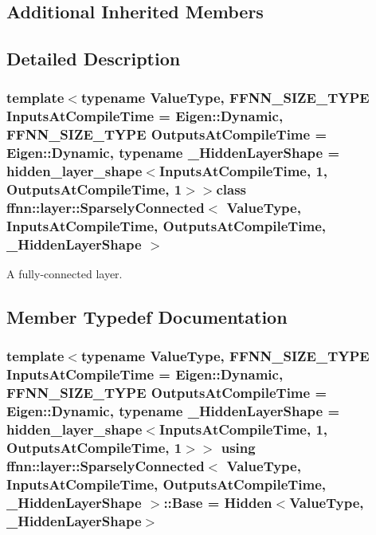 \subsection*{Additional Inherited Members}


\subsection{Detailed Description}
\subsubsection*{template$<$typename Value\-Type, F\-F\-N\-N\-\_\-\-S\-I\-Z\-E\-\_\-\-T\-Y\-P\-E Inputs\-At\-Compile\-Time = Eigen\-::\-Dynamic, F\-F\-N\-N\-\_\-\-S\-I\-Z\-E\-\_\-\-T\-Y\-P\-E Outputs\-At\-Compile\-Time = Eigen\-::\-Dynamic, typename \-\_\-\-Hidden\-Layer\-Shape = hidden\-\_\-layer\-\_\-shape$<$\-Inputs\-At\-Compile\-Time, 1, Outputs\-At\-Compile\-Time, 1$>$$>$class ffnn\-::layer\-::\-Sparsely\-Connected$<$ Value\-Type, Inputs\-At\-Compile\-Time, Outputs\-At\-Compile\-Time, \-\_\-\-Hidden\-Layer\-Shape $>$}

A fully-\/connected layer. 

\subsection{Member Typedef Documentation}
\hypertarget{classffnn_1_1layer_1_1_sparsely_connected_a477e3c462a713ae90ac5d68c94445a08}{
\subsubsection[{Base}]{\setlength{\rightskip}{0pt plus 5cm}template$<$typename Value\-Type, F\-F\-N\-N\-\_\-\-S\-I\-Z\-E\-\_\-\-T\-Y\-P\-E Inputs\-At\-Compile\-Time = Eigen\-::\-Dynamic, F\-F\-N\-N\-\_\-\-S\-I\-Z\-E\-\_\-\-T\-Y\-P\-E Outputs\-At\-Compile\-Time = Eigen\-::\-Dynamic, typename \-\_\-\-Hidden\-Layer\-Shape = hidden\-\_\-layer\-\_\-shape$<$\-Inputs\-At\-Compile\-Time, 1, Outputs\-At\-Compile\-Time, 1$>$$>$ using {\bf ffnn\-::layer\-::\-Sparsely\-Connected}$<$ Value\-Type, Inputs\-At\-Compile\-Time, Outputs\-At\-Compile\-Time, \-\_\-\-Hidden\-Layer\-Shape $>$\-::{\bf Base} =  {\bf Hidden}$<$Value\-Type, \-\_\-\-Hidden\-Layer\-Shape$>$}}\label{classffnn_1_1layer_1_1_sparsely_connected_a477e3c462a713ae90ac5d68c94445a08}


